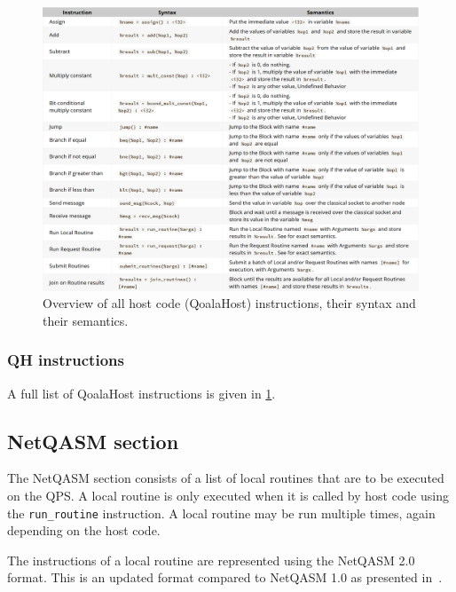 \begin{figure}
    \centering
    \includegraphics[scale=0.35]{figures/qoala/qh_table.png}
    \caption{Overview of all host code (QoalaHost) instructions, their syntax and their semantics.}
    \label{qoala:fig:app:qh_table}
\end{figure}

\subsubsection{QH instructions}
A full list of QoalaHost instructions is given in \cref{qoala:fig:app:qh_table}.


\subsection{NetQASM section}
\label{qoala:sec:app:netqasm}
The NetQASM section consists of a list of local routines that are to be executed on the QPS.
A local routine is only executed when it is called by host code using the \texttt{run\_routine} instruction. A local routine may be run multiple times, again depending on the host code.

The instructions of a local routine are represented using the NetQASM 2.0 format.
This is an updated format compared to NetQASM 1.0 as presented in~\cite{dahlberg2022netqasm}.


